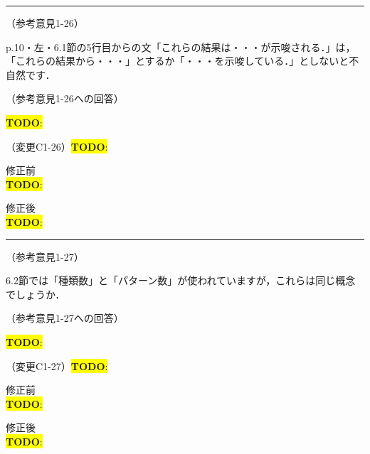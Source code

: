 \documentclass{jarticle} %
\newcommand{\todo}[1]{\colorbox{yellow}{{\bf TODO}:}{\color{blue}{\textbf{[#1]}}}}
\def\subsection#1{ \vspace{1pc} {\gt #1} }
\def\nextans{ \vspace{2pc} \hrule }
\begin{document}
\newpage
\nextans
\subsection{（参考意見1-26）}

p.10・左・6.1節の5行目からの文「これらの結果は・・・が示唆される．」は，「これらの結果から・・・」とするか「・・・を示唆している．」としないと不自然です．

\subsection{（参考意見1-26への回答）}

\todo{hoge}

\subsection{（変更C1-26）\todo{hoge}}
\vspace{-0.3cm}
\begin{description}
\item 修正前\\
\phantom{　}
\todo{hoge}
\vspace{-0.3cm}
\item 修正後\\
\phantom{　}
\todo{hoge}
\end{description}

\newpage
\nextans
\subsection{（参考意見1-27）}

6.2節では「種類数」と「パターン数」が使われていますが，これらは同じ概念でしょうか．

\subsection{（参考意見1-27への回答）}

\todo{hoge}

\subsection{（変更C1-27）\todo{hoge}}
\vspace{-0.3cm}
\begin{description}
\item 修正前\\
\phantom{　}
\todo{hoge}
\vspace{-0.3cm}
\item 修正後\\
\phantom{　}
\todo{hoge}
\end{description}
\end{document}
